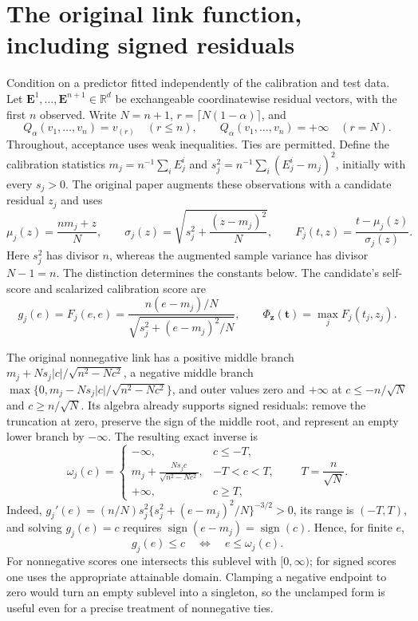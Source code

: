 \newtheorem{mtproposition}{Proposition}
\newtheorem{mttheorem}{Theorem}

\section{The original link function, including signed residuals}
Condition on a predictor fitted independently of the calibration and test data.
Let $\mathbf E^1,\ldots,\mathbf E^{n+1}\in\mathbb R^d$ be exchangeable
coordinatewise residual vectors, with the first $n$ observed. Write $N=n+1$,
$r=\lceil N(1-\alpha)\rceil$, and
\[
 Q_\alpha(v_1,\ldots,v_n)=v_{(r)}\quad(r\le n),
 \qquad Q_\alpha(v_1,\ldots,v_n)=+\infty\quad(r=N).
\]
Throughout, acceptance uses weak inequalities. Ties are permitted. Define
the calibration statistics $m_j=n^{-1}\sum_i E^i_j$ and
$s_j^2=n^{-1}\sum_i(E^i_j-m_j)^2$, initially with every $s_j>0$.
The original paper \cite{fan2025} augments these observations with a candidate residual
$z_j$ and uses
\begin{equation}\label{mt:augmented}
 \mu_j(z)=\frac{nm_j+z}{N},\qquad
 \sigma_j(z)=\sqrt{s_j^2+\frac{(z-m_j)^2}{N}},\qquad
 F_j(t,z)=\frac{t-\mu_j(z)}{\sigma_j(z)}.
\end{equation}
Here $s_j^2$ has divisor $n$, whereas the augmented sample variance has
divisor $N-1=n$. The distinction determines the constants below.
The candidate's self-score and scalarized calibration score are
\begin{equation}\label{mt:self}
 g_j(e)=F_j(e,e)=
 \frac{n(e-m_j)/N}{\sqrt{s_j^2+(e-m_j)^2/N}},\qquad
 \Phi_{\mathbf z}(\mathbf t)=\max_jF_j(t_j,z_j).
\end{equation}

The original nonnegative link has a positive middle branch
$m_j+Ns_j|c|/\sqrt{n^2-Nc^2}$, a negative middle branch
$\max\{0,m_j-Ns_j|c|/\sqrt{n^2-Nc^2}\}$, and outer values zero and
$+\infty$ at $c\le-n/\sqrt N$ and $c\ge n/\sqrt N$.
Its algebra already supports signed residuals: remove the truncation at zero,
preserve the sign of the middle root, and represent an empty lower branch by
$-\infty$. The resulting exact inverse is
\begin{equation}\label{mt:link}
 \omega_j(c)=\begin{cases}
 -\infty,&c\le -T,\\[2pt]
 m_j+\displaystyle\frac{Ns_jc}{\sqrt{n^2-Nc^2}},&-T<c<T,\\[5pt]
 +\infty,&c\ge T,
 \end{cases}\qquad T=\frac n{\sqrt N}.
\end{equation}
Indeed, $g_j'(e)=(n/N)s_j^2\{s_j^2+(e-m_j)^2/N\}^{-3/2}>0$,
its range is $(-T,T)$, and solving $g_j(e)=c$ requires
$\operatorname{sign}(e-m_j)=\operatorname{sign}(c)$. Hence, for finite $e$,
\begin{equation}\label{mt:inverse}
 g_j(e)\le c\quad\Longleftrightarrow\quad e\le\omega_j(c).
\end{equation}
For nonnegative scores one intersects this sublevel with $[0,\infty)$;
for signed scores one uses the appropriate attainable domain. Clamping a
negative endpoint to zero would turn an empty sublevel into a singleton, so
the unclamped form is useful even for a precise treatment of nonnegative ties.

